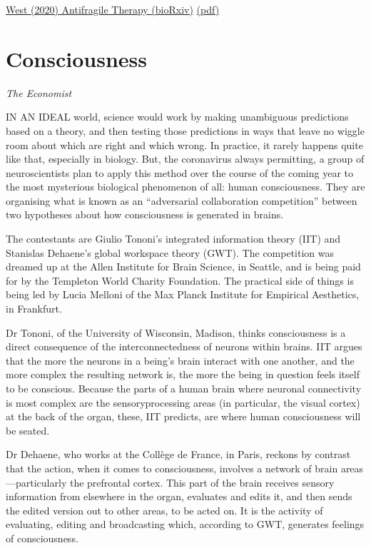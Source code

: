 \documentclass[
]{book}
\begin{document}
\href{https://doi.org/10.1101/2020.10.08.331678}{West (2020) Antifragile Therapy (bioRxiv)}
\href{pdf/West_2020_Antifragile_Therapy.pdf}{(pdf)}

\hypertarget{consciousness}{%
\chapter{Consciousness}\label{consciousness}}

\emph{The Economist}

IN AN IDEAL world, science would work by making unambiguous predictions based on a theory, and then testing those predictions in ways that leave no wiggle room about which are right and which wrong. In practice, it rarely happens quite like that, especially in biology. But, the coronavirus always permitting, a group of neuroscientists plan to apply this method over the course of the coming year to the most mysterious biological phenomenon of all: human consciousness. They are organising what is known as an ``adversarial collab­oration competition'' between two hypotheses about how consciousness is generated in brains.

The contestants are Giulio Tononi's integrated information theory (IIT) and Stanislas Dehaene's global workspace theory (GWT). The competition was dreamed up at the Allen Institute for Brain Science, in Seattle, and is being paid for by the Templeton World Charity Foundation. The practical side of things is being led by Lucia Melloni of the Max Planck Institute for Empirical Aesthetics, in Frankfurt.

Dr Tononi, of the University of Wisconsin, Madison, thinks consciousness is a direct consequence of the interconnectedness of neurons within brains. IIT argues that the more the neurons in a being's brain interact with one another, and the more complex the resulting network is, the more the being in question feels itself to be conscious. Because the parts of a human brain where neuronal connectivity is most complex are the sensoryprocessing areas (in particular, the visual cortex) at the back of the organ, these, IIT predicts, are where human consciousness will be seated.

Dr Dehaene, who works at the Collège de France, in Paris, reckons by contrast that the action, when it comes to consciousness, involves a network of brain areas---particularly the prefrontal cortex. This part of the brain receives sensory information from elsewhere in the organ, evaluates and edits it, and then sends the edited version out to other areas, to be acted on. It is the activity of evaluating, editing and broadcasting which, according to GWT, generates feelings of consciousness.
\end{document}
